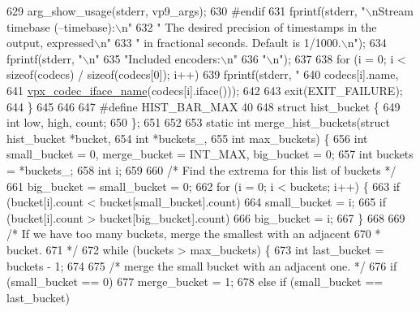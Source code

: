 \begin{DoxyCodeInclude}
{{{{{{{{{{629   arg\_show\_usage(stderr, vp9\_args);
630 \textcolor{preprocessor}{#endif}
631   fprintf(stderr, \textcolor{stringliteral}{"\(\backslash\)nStream timebase (--timebase):\(\backslash\)n"}
632           \textcolor{stringliteral}{"  The desired precision of timestamps in the output, expressed\(\backslash\)n"}
633           \textcolor{stringliteral}{"  in fractional seconds. Default is 1/1000.\(\backslash\)n"});
634   fprintf(stderr, \textcolor{stringliteral}{"\(\backslash\)n"}
635           \textcolor{stringliteral}{"Included encoders:\(\backslash\)n"}
636           \textcolor{stringliteral}{"\(\backslash\)n"});
637 
638   \textcolor{keywordflow}{for} (i = 0; i < \textcolor{keyword}{sizeof}(codecs) / \textcolor{keyword}{sizeof}(codecs[0]); i++)
639     fprintf(stderr, \textcolor{stringliteral}{"    %
640             codecs[i].name,
641             \hyperlink{group__codec_ga9eee39f450d8cdcf5aba0e2bda6e5aa8}{vpx\_codec\_iface\_name}(codecs[i].iface()));
642 
643   exit(EXIT\_FAILURE);
644 \}
645 
646 
647 \textcolor{preprocessor}{#define HIST\_BAR\_MAX 40}
648 \textcolor{keyword}{struct }hist\_bucket \{
649   \textcolor{keywordtype}{int} low, high, count;
650 \};
651 
652 
653 \textcolor{keyword}{static} \textcolor{keywordtype}{int} merge\_hist\_buckets(\textcolor{keyword}{struct} hist\_bucket *bucket,
654                               \textcolor{keywordtype}{int} *buckets\_,
655                               \textcolor{keywordtype}{int} max\_buckets) \{
656   \textcolor{keywordtype}{int} small\_bucket = 0, merge\_bucket = INT\_MAX, big\_bucket = 0;
657   \textcolor{keywordtype}{int} buckets = *buckets\_;
658   \textcolor{keywordtype}{int} i;
659 
660   \textcolor{comment}{/* Find the extrema for this list of buckets */}
661   big\_bucket = small\_bucket = 0;
662   \textcolor{keywordflow}{for} (i = 0; i < buckets; i++) \{
663     \textcolor{keywordflow}{if} (bucket[i].count < bucket[small\_bucket].count)
664       small\_bucket = i;
665     \textcolor{keywordflow}{if} (bucket[i].count > bucket[big\_bucket].count)
666       big\_bucket = i;
667   \}
668 
669   \textcolor{comment}{/* If we have too many buckets, merge the smallest with an adjacent}
670 \textcolor{comment}{   * bucket.}
671 \textcolor{comment}{   */}
672   \textcolor{keywordflow}{while} (buckets > max\_buckets) \{
673     \textcolor{keywordtype}{int} last\_bucket = buckets - 1;
674 
675     \textcolor{comment}{/* merge the small bucket with an adjacent one. */}
676     \textcolor{keywordflow}{if} (small\_bucket == 0)
677       merge\_bucket = 1;
678     \textcolor{keywordflow}{else} \textcolor{keywordflow}{if} (small\_bucket == last\_bucket)
}}}}}}}}}}}
\end{DoxyCodeInclude}
